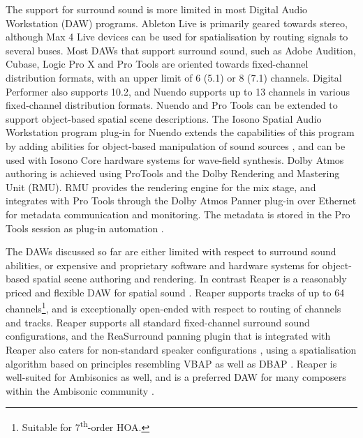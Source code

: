 \documentclass{article}
\begin{document}
The support for surround sound is more limited in most Digital Audio Workstation (DAW) programs.
Ableton Live is primarily geared towards stereo, although Max 4 Live devices can be used for spatialisation by routing signals to several buses.
Most DAWs that support surround sound, such as Adobe Audition, Cubase, Logic Pro X and Pro Tools are oriented towards fixed-channel distribution formats, with an upper limit of 6 (5.1) or 8 (7.1) channels.
Digital Performer also supports 10.2, and Nuendo supports up to 13 channels in various fixed-channel distribution formats.
Nuendo and Pro Tools can be extended to support object-based spatial scene descriptions.
The Iosono Spatial Audio Workstation program plug-in for Nuendo extends the capabilities of this program by adding abilities for object-based manipulation of sound sources \cite{iosono2012:workstation}, and can be used with Iosono Core hardware systems for wave-field synthesis.
Dolby Atmos authoring is achieved using ProTools and the Dolby Rendering and Mastering Unit (RMU).
RMU provides the rendering engine for the mix stage, and integrates with Pro Tools through the Dolby Atmos Panner plug-in over Ethernet for metadata communication and monitoring. 
The metadata is stored in the Pro Tools session as plug-in automation \cite{dolby:2013authoring}.

The DAWs discussed so far are either limited with respect to surround sound abilities, or expensive and proprietary software and hardware systems for object-based spatial scene authoring and rendering.
In contrast Reaper is a reasonably priced and flexible DAW for spatial sound \cite{cockos:2014reaper}.
Reaper supports tracks of up to 64 channels\footnote{Suitable for 7\textsuperscript{th}-order HOA.}, and is exceptionally open-ended with respect to routing of channels and tracks.
Reaper supports all standard fixed-channel surround sound configurations, and the ReaSurround panning plugin that is integrated with Reaper also caters for non-standard speaker configurations \cite{francis:2014_reaper}, using a spatialisation algorithm based on principles resembling VBAP \cite{Pulkki:1997vbap} as well as DBAP \cite{Lossius:2009dbap}.
Reaper is well-suited for Ambisonics as well, and is a preferred DAW for many composers within the Ambisonic  community \cite{wiggins:2012reaperhowto}.
\end{document}
